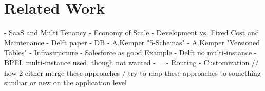 \section{Related Work}
\label{sec:relatedwork}

- SaaS and Multi Tenancy
  - Economy of Scale
    - Development vs. Fixed Cost and Maintenance
    - Delft paper
- DB
  - A.Kemper "5-Schemas"
  - A.Kemper "Versioned Tables"
- Infrastructure
  - Salesforce as good Example
  - Delft no multi-instance
  - BPEL multi-instance used, though not wanted
- ...
  - Routing
  - Customization // how 2 either merge these approaches / try to map these approaches to something similiar or new on the application level